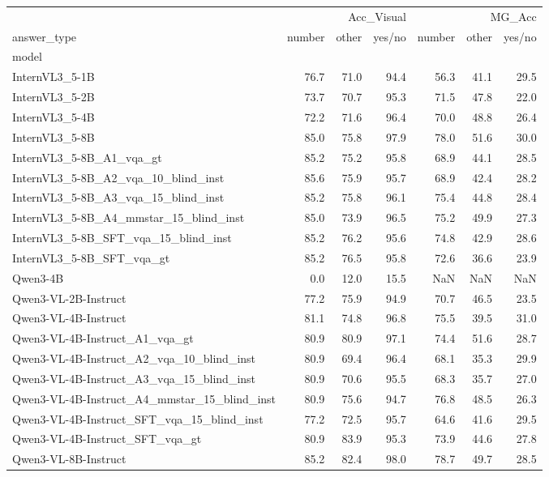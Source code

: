 \begin{tabular}{lrrrrrr}
\toprule
 & \multicolumn{3}{r}{Acc_Visual} & \multicolumn{3}{r}{MG_Acc} \\
answer_type & number & other & yes/no & number & other & yes/no \\
model &  &  &  &  &  &  \\
\midrule
InternVL3_5-1B & 76.7 & 71.0 & 94.4 & 56.3 & 41.1 & 29.5 \\
InternVL3_5-2B & 73.7 & 70.7 & 95.3 & 71.5 & 47.8 & 22.0 \\
InternVL3_5-4B & 72.2 & 71.6 & 96.4 & 70.0 & 48.8 & 26.4 \\
InternVL3_5-8B & 85.0 & 75.8 & 97.9 & 78.0 & 51.6 & 30.0 \\
InternVL3_5-8B_A1_vqa_gt & 85.2 & 75.2 & 95.8 & 68.9 & 44.1 & 28.5 \\
InternVL3_5-8B_A2_vqa_10_blind_inst & 85.6 & 75.9 & 95.7 & 68.9 & 42.4 & 28.2 \\
InternVL3_5-8B_A3_vqa_15_blind_inst & 85.2 & 75.8 & 96.1 & 75.4 & 44.8 & 28.4 \\
InternVL3_5-8B_A4_mmstar_15_blind_inst & 85.0 & 73.9 & 96.5 & 75.2 & 49.9 & 27.3 \\
InternVL3_5-8B_SFT_vqa_15_blind_inst & 85.2 & 76.2 & 95.6 & 74.8 & 42.9 & 28.6 \\
InternVL3_5-8B_SFT_vqa_gt & 85.2 & 76.5 & 95.8 & 72.6 & 36.6 & 23.9 \\
Qwen3-4B & 0.0 & 12.0 & 15.5 & NaN & NaN & NaN \\
Qwen3-VL-2B-Instruct & 77.2 & 75.9 & 94.9 & 70.7 & 46.5 & 23.5 \\
Qwen3-VL-4B-Instruct & 81.1 & 74.8 & 96.8 & 75.5 & 39.5 & 31.0 \\
Qwen3-VL-4B-Instruct_A1_vqa_gt & 80.9 & 80.9 & 97.1 & 74.4 & 51.6 & 28.7 \\
Qwen3-VL-4B-Instruct_A2_vqa_10_blind_inst & 80.9 & 69.4 & 96.4 & 68.1 & 35.3 & 29.9 \\
Qwen3-VL-4B-Instruct_A3_vqa_15_blind_inst & 80.9 & 70.6 & 95.5 & 68.3 & 35.7 & 27.0 \\
Qwen3-VL-4B-Instruct_A4_mmstar_15_blind_inst & 80.9 & 75.6 & 94.7 & 76.8 & 48.5 & 26.3 \\
Qwen3-VL-4B-Instruct_SFT_vqa_15_blind_inst & 77.2 & 72.5 & 95.7 & 64.6 & 41.6 & 29.5 \\
Qwen3-VL-4B-Instruct_SFT_vqa_gt & 80.9 & 83.9 & 95.3 & 73.9 & 44.6 & 27.8 \\
Qwen3-VL-8B-Instruct & 85.2 & 82.4 & 98.0 & 78.7 & 49.7 & 28.5 \\

\end{tabular}
